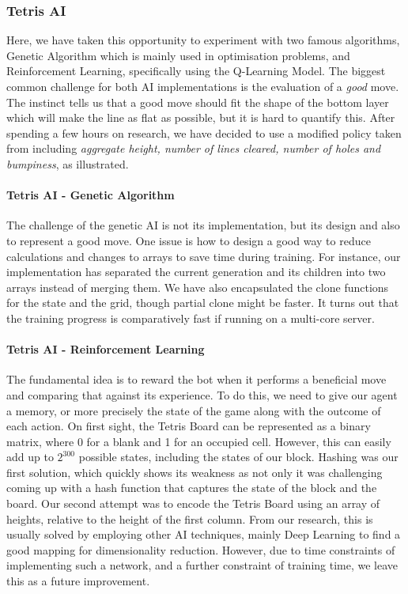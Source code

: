 \documentclass[11pt]{article}
\begin{document}
\subsubsection{Tetris AI}
Here, we have taken this opportunity to experiment with two famous algorithms, Genetic Algorithm which is mainly used in optimisation problems, and Reinforcement Learning, specifically using the Q-Learning Model. The biggest common challenge for both AI implementations is the evaluation of a \textit{good} move. The instinct tells us that a good move should fit the shape of the bottom layer which will make the line as flat as possible, but it is hard to quantify this. After spending a few hours on research, we have decided to use a modified policy taken from \cite{tetrisai} including \textit{aggregate height, number of lines cleared, number of holes and bumpiness}, as illustrated.  

\paragraph{Tetris AI - Genetic Algorithm}
\begin{flushleft}
The challenge of the genetic AI is not its implementation, but its design and also to represent a good move. One issue is how to design a good way to reduce calculations and changes to arrays to save time during training. For instance, our implementation has separated the current generation and its children into two arrays instead of merging them. We have also encapsulated the clone functions for the state and the grid, though partial clone might be faster. It turns out that the training progress is comparatively fast if running on a multi-core server.
\end{flushleft}


\paragraph{Tetris AI - Reinforcement Learning}
\begin{flushleft}
The fundamental idea is to reward the bot when it performs a beneficial move and comparing that against its experience. To do this, we need to give our agent a memory, or more precisely the state of the game along with the outcome of each action. On first sight, the Tetris Board can be represented as a binary matrix, where 0 for a blank and 1 for an occupied cell. However, this can easily add up to ${2^{300}}$ possible states, including the states of our block. Hashing was our first solution, which quickly shows its weakness as not only it was challenging coming up with a hash function that captures the state of the block and the board. Our second attempt was to encode the Tetris Board using an array of heights, relative to the height of the first column. From our research, this is usually solved by employing other AI techniques, mainly Deep Learning to find a good mapping for dimensionality reduction. However, due to time constraints of implementing such a network, and a further constraint of training time, we leave this as a future improvement.
\end{flushleft}
\end{document}
